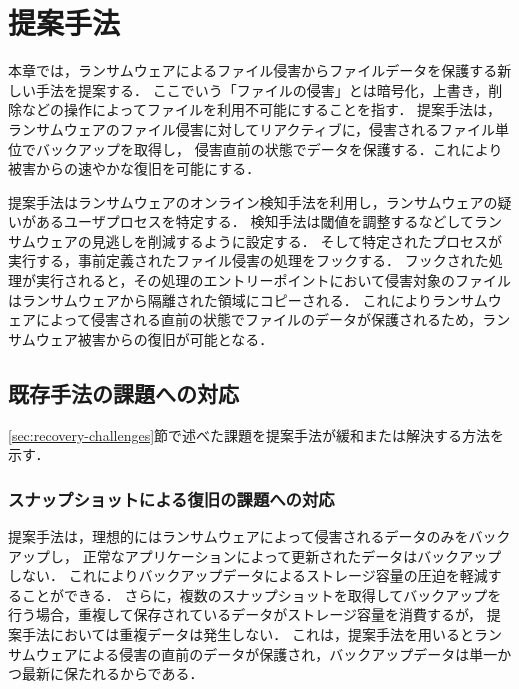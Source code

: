 \chapter{提案手法}
本章では，ランサムウェアによるファイル侵害からファイルデータを保護する新しい手法を提案する．
ここでいう「ファイルの侵害」とは暗号化，上書き，削除などの操作によってファイルを利用不可能にすることを指す．
提案手法は，ランサムウェアのファイル侵害に対してリアクティブに，侵害されるファイル単位でバックアップを取得し，
侵害直前の状態でデータを保護する．これにより被害からの速やかな復旧を可能にする．

提案手法はランサムウェアのオンライン検知手法を利用し，ランサムウェアの疑いがあるユーザプロセスを特定する．
検知手法は閾値を調整するなどしてランサムウェアの見逃しを削減するように設定する．
そして特定されたプロセスが実行する，事前定義されたファイル侵害の処理をフックする．
フックされた処理が実行されると，その処理のエントリーポイントにおいて侵害対象のファイルはランサムウェアから隔離された領域にコピーされる．
これによりランサムウェアによって侵害される直前の状態でファイルのデータが保護されるため，ランサムウェア被害からの復旧が可能となる．

\section{既存手法の課題への対応}
\ref{sec:recovery-challenges}節で述べた課題を提案手法が緩和または解決する方法を示す．
\subsection{スナップショットによる復旧の課題への対応}
提案手法は，理想的にはランサムウェアによって侵害されるデータのみをバックアップし，
正常なアプリケーションによって更新されたデータはバックアップしない．
これによりバックアップデータによるストレージ容量の圧迫を軽減することができる．
さらに，複数のスナップショットを取得してバックアップを行う場合，重複して保存されているデータがストレージ容量を消費するが，
提案手法においては重複データは発生しない．
これは，提案手法を用いるとランサムウェアによる侵害の直前のデータが保護され，バックアップデータは単一かつ最新に保たれるからである．


